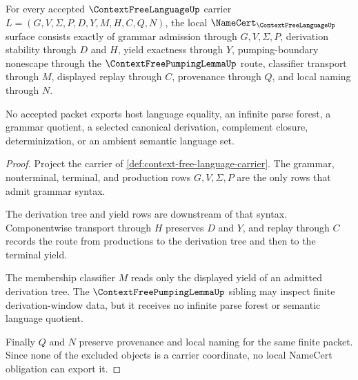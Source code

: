 \begin{theorem}
\label{thm:context-free-language-namecert-obligations}
For every accepted $\ContextFreeLanguageUp$ carrier $L=(G,V,\Sigma,P,D,Y,M,H,C,Q,N)$, the local $\NameCert_{\ContextFreeLanguageUp}$ surface consists exactly of grammar admission through $G,V,\Sigma,P$, derivation stability through $D$ and $H$, yield exactness through $Y$, pumping-boundary nonescape through the $\ContextFreePumpingLemmaUp$ route, classifier transport through $M$, displayed replay through $C$, provenance through $Q$, and local naming through $N$.

No accepted packet exports host language equality, an infinite parse forest, a grammar quotient, a selected canonical derivation, complement closure, determinization, or an ambient semantic language set.
\end{theorem}
\begin{proof}
Project the carrier of \autoref{def:context-free-language-carrier}. The grammar, nonterminal, terminal, and production rows $G,V,\Sigma,P$ are the only rows that admit grammar syntax.

The derivation tree and yield rows are downstream of that syntax. Componentwise transport through $H$ preserves $D$ and $Y$, and replay through $C$ records the route from productions to the derivation tree and then to the terminal yield.

The membership classifier $M$ reads only the displayed yield of an admitted derivation tree. The $\ContextFreePumpingLemmaUp$ sibling may inspect finite derivation-window data, but it receives no infinite parse forest or semantic language quotient.

Finally $Q$ and $N$ preserve provenance and local naming for the same finite packet. Since none of the excluded objects is a carrier coordinate, no local NameCert obligation can export it.
\end{proof}

